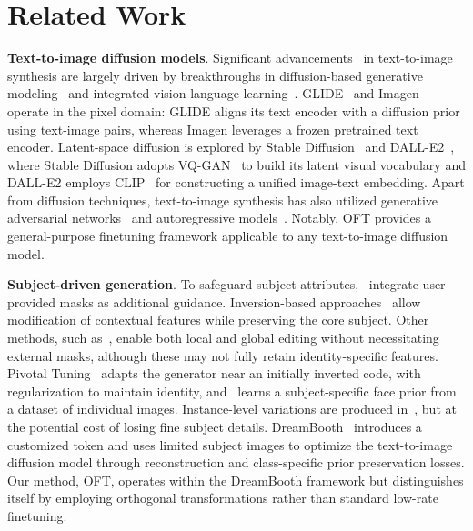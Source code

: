 \section{Related Work}

\textbf{Text-to-image diffusion models}. Significant advancements~\cite{saharia2022photorealistic,ramesh2022hierarchical,rombach2022high,gu2022vector,nichol2022glide} in text-to-image synthesis are largely driven by breakthroughs in diffusion-based generative modeling~\cite{ho2020denoising,song2021score,song2021denoising,dhariwal2021diffusion} and integrated vision-language learning~\cite{su2020vlbert,lu2019vilbert,radford2021learning,wang2021simvlm,li2022blip,li2023blip,alayrac2022flamingo,schuhmann2022laion}. GLIDE~\cite{nichol2022glide} and Imagen~\cite{saharia2022photorealistic} operate in the pixel domain: GLIDE aligns its text encoder with a diffusion prior using text-image pairs, whereas Imagen leverages a frozen pretrained text encoder. Latent-space diffusion is explored by Stable Diffusion~\cite{rombach2022high} and DALL-E2~\cite{ramesh2022hierarchical}, where Stable Diffusion adopts VQ-GAN~\cite{esser2021taming} to build its latent visual vocabulary and DALL-E2 employs CLIP~\cite{radford2021learning} for constructing a unified image-text embedding. Apart from diffusion techniques, text-to-image synthesis has also utilized generative adversarial networks~\cite{reed2016generative,zhang2017stackgan,xu2018attngan,li2019controllable} and autoregressive models~\cite{ramesh2021zero,ding2021cogview,wu2022nuwa,yuscaling}. Notably, OFT provides a general-purpose finetuning framework applicable to any text-to-image diffusion model.

\textbf{Subject-driven generation}. To safeguard subject attributes,~\cite{avrahami2022blended,nichol2022glide} integrate user-provided masks as additional guidance. Inversion-based approaches~\cite{choi2021ilvr,dhariwal2021diffusion,ramesh2022hierarchical,gal2022image} allow modification of contextual features while preserving the core subject. Other methods, such as~\cite{hertz2022prompt}, enable both local and global editing without necessitating external masks, although these may not fully retain identity-specific features. Pivotal Tuning~\cite{roich2022pivotal} adapts the generator near an initially inverted code, with regularization to maintain identity, and~\cite{nitzan2022mystyle} learns a subject-specific face prior from a dataset of individual images. Instance-level variations are produced in~\cite{casanova2021instance}, but at the potential cost of losing fine subject details. DreamBooth~\cite{ruiz2023dreambooth} introduces a customized token and uses limited subject images to optimize the text-to-image diffusion model through reconstruction and class-specific prior preservation losses. Our method, OFT, operates within the DreamBooth framework but distinguishes itself by employing orthogonal transformations rather than standard low-rate finetuning.

